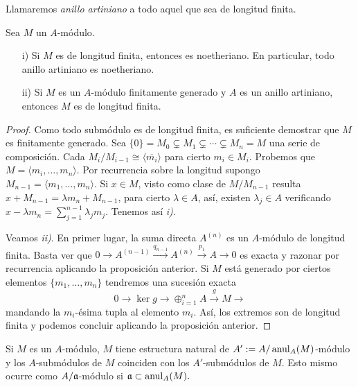 \documentclass[../main.tex]{subfiles}
\begin{document}
\begin{definition}
Llamaremos \textit{anillo artiniano} a todo aquel que sea de longitud finita.
\end{definition}

\begin{corollary}Sea $M$ un $A$-módulo.
\begin{itemize}
    \item[i)] Si $M$ es de longitud finita, entonces es noetheriano. En particular, todo anillo artiniano es noetheriano.
    \item[ii)] Si $M$ es un $A$-módulo finitamente generado y $A$ es un anillo artiniano, entonces $M$ es de longitud finita.
\end{itemize}
\end{corollary}
\begin{proof}
Como todo submódulo es de longitud finita, es suficiente demostrar que $M$ es finitamente generado. Sea $\{0\}=M_0\subsetneq M_1\subsetneq\cdots\subsetneq M_n=M$ una serie de composición. Cada $M_i/M_{i-1}\cong \langle\overline{m_i}\rangle$ para cierto $m_i\in M_i.$ Probemos que $M=\langle m_i,\dots,m_n\rangle.$ Por recurrencia sobre la longitud supongo $M_{n-1}=\langle m_1,\dots,m_n\rangle.$ Si $x\in M$, visto como clase de $M/M_{n-1}$ resulta $x+M_{n-1}=\lambda m_n+ M_{n-1}$, para cierto $\lambda\in A$, así, existen $\lambda_j\in A$ verificando $x-\lambda m_n=\sum_{j=1}^{n-1}\lambda_j m_j.$ Tenemos así \textit{i)}.

Veamos \textit{ii)}. En primer lugar, la suma directa $A^{(n)}$ es un $A$-módulo de longitud finita. Basta ver que $0\rightarrow A^{(n-1)}\overset{q_{n-1}}{\rightarrow}A^{(n)}\overset{p_1}{\rightarrow}A\rightarrow 0$ es exacta y razonar por recurrencia aplicando la proposición anterior. Si $M$ está generado por ciertos elementos $\{m_1,\dots,m_n\}$ tendremos una sucesión exacta
$$0\rightarrow\ker g\rightarrow\oplus_{i=1}^n A\overset{g}{\rightarrow}M\rightarrow$$
mandando la $m_i$-ésima tupla al elemento $m_i.$ Así, los extremos son de longitud finita y podemos concluir aplicando la proposición anterior.
\end{proof}

\begin{remark}
Si $M$ es un $A$-módulo, $M$ tiene estructura natural de $A':=A/\operatorname{anul}_A(M)$-módulo y los $A$-submódulos de $M$ coinciden con los $A'$-submódulos de $M.$ Esto mismo ocurre como $A/\mathfrak{a}$-módulo si $\mathfrak{a}\subset\operatorname{anul}_A(M).$
\end{remark}
\end{document}
